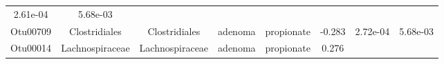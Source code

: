 \documentclass[11pt,]{article}
\begin{document}
\begin{longtable}[]{@{}cccccccc@{}}
\begin{minipage}[t]{0.08\columnwidth}
2.61e-04\strut
\end{minipage} & \begin{minipage}[t]{0.08\columnwidth}\centering\strut
5.68e-03\strut
\end{minipage}\tabularnewline
\begin{minipage}[t]{0.08\columnwidth}\centering\strut
Otu00709\strut
\end{minipage} & \begin{minipage}[t]{0.15\columnwidth}\centering\strut
Clostridiales\strut
\end{minipage} & \begin{minipage}[t]{0.15\columnwidth}\centering\strut
Clostridiales\strut
\end{minipage} & \begin{minipage}[t]{0.08\columnwidth}\centering\strut
adenoma\strut
\end{minipage} & \begin{minipage}[t]{0.09\columnwidth}\centering\strut
propionate\strut
\end{minipage} & \begin{minipage}[t]{0.07\columnwidth}\centering\strut
-0.283\strut
\end{minipage} & \begin{minipage}[t]{0.08\columnwidth}\centering\strut
2.72e-04\strut
\end{minipage} & \begin{minipage}[t]{0.08\columnwidth}\centering\strut
5.68e-03\strut
\end{minipage}\tabularnewline
\begin{minipage}[t]{0.08\columnwidth}\centering\strut
Otu00014\strut
\end{minipage} & \begin{minipage}[t]{0.15\columnwidth}\centering\strut
Lachnospiraceae\strut
\end{minipage} & \begin{minipage}[t]{0.15\columnwidth}\centering\strut
Lachnospiraceae\strut
\end{minipage} & \begin{minipage}[t]{0.08\columnwidth}\centering\strut
adenoma\strut
\end{minipage} & \begin{minipage}[t]{0.09\columnwidth}\centering\strut
propionate\strut
\end{minipage} & \begin{minipage}[t]{0.07\columnwidth}\centering\strut
0.276\strut
\end{minipage} & \begin{minipage}[t]{0.08\columnwidth}\centering\strut

\end{minipage}
\end{longtable}
\end{document}
